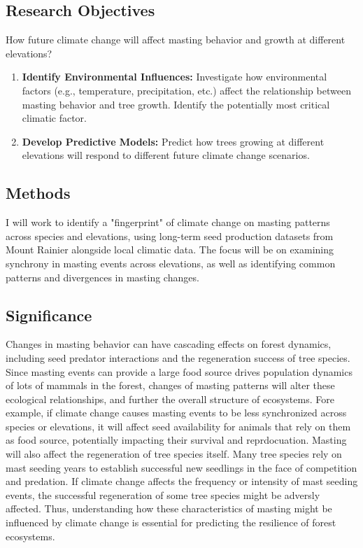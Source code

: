 \documentclass[11pt,letter]{article}
\begin{document}
\subsection{Research Objectives}
How future climate change will affect masting behavior and growth at different elevations?
	\begin{enumerate}
\item \textbf{Identify Environmental Influences:} Investigate how environmental factors (e.g., temperature, precipitation, etc.) affect the relationship between masting behavior and tree growth. Identify the potentially most critical climatic factor.	
\item \textbf{Develop Predictive Models:} Predict how trees growing at different elevations will respond to different future climate change scenarios.		
	\end{enumerate}
\subsection{Methods}
I will work to identify a "fingerprint" of climate change on masting patterns across species and elevations, using long-term seed production datasets from Mount Rainier alongside local climatic data. The focus will be on examining synchrony in masting events across elevations, as well as identifying common patterns and divergences in masting changes.
\subsection{Significance}
Changes in masting behavior can have cascading effects on forest dynamics, including seed predator interactions and the regeneration success of tree species. Since masting events can provide a large food source drives population dynamics of lots of mammals in the forest, changes of masting patterns will alter these ecological relationships, and further the overall structure of ecosystems. Fore example, if climate change causes masting events to be less synchronized across species or elevations, it will affect seed availability for animals that rely on them as food source, potentially impacting their survival and reprdocuation.
Masting will also affect the regeneration of tree species itself. Many tree species rely on mast seeding years to establish successful new seedlings in the face of competition and predation. If climate change affects the frequency or intensity of mast seeding events, the successful regeneration of some tree species might be adversly affected. Thus, understanding how these characteristics of masting might be influenced by climate change is essential for predicting the resilience of forest ecosystems.


 
\end{document}
